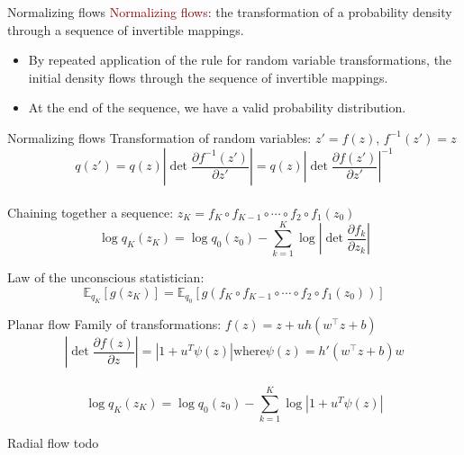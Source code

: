 \documentclass[unicode,11pt]{beamer}
\begin{document}
\begin{frame}[fragile]{Normalizing flows}
\textcolor{darkred}{Normalizing flows}: the transformation of a probability density through
a sequence of invertible mappings.
\begin{itemize}
  \item By repeated application of the rule for random variable transformations, the initial
density flows through the sequence of invertible mappings.
  \item At the end of the sequence, we have a valid probability distribution.
\end{itemize}

\end{frame}

\begin{frame}[fragile]{Normalizing flows}
Transformation of random variables: $z' = f(z)$, $f^{-1}(z') = z$\\
$$q(z') = q(z) \left\vert \det \frac{\partial f^{-1}(z')}{\partial z'} \right\vert = 
q(z) \left\vert \det \frac{\partial f(z')}{\partial z'} \right\vert^{-1}$$\\
Chaining together a sequence: $z_K = f_K \circ f_{K−1} \circ \cdots \circ f_2 \circ f_1(z_0)$\\
$$\log q_K(z_K) = \log q_0(z_0) − \sum_{k=1}^K \log \left\vert \det \frac{\partial f_k}{\partial z_k} \right\vert $$

Law of the unconscious statistician:\\
$$\mathbb{E}_{q_K} \left[g(z_K)\right] = \mathbb{E}_{q_0} \left[ g(f_K \circ f_{K−1} \circ \cdots \circ f_2 \circ f_1(z_0)) \right] $$
\end{frame}

\begin{frame}[fragile]{Planar flow}
Family of transformations: $f(z) = z + uh(w^⊤z + b)$\\
\vspace{5mm}
$$\left\vert \det \frac{\partial f(z)}{\partial z} \right\vert = \left\vert 1 + u^T \psi(z) \right\vert \text{where} \psi(z) = h'(w^⊤z + b)w$$ \\
$$\log q_K(z_K) = \log q_0(z_0) − \sum_{k=1}^K \log \left\vert 1 + u^T \psi(z) \right\vert $$
\end{frame}

\begin{frame}[fragile]{Radial flow}
todo

\end{frame}
\end{document}
